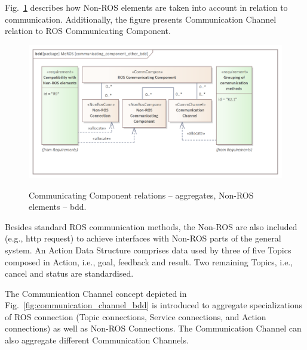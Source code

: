 \documentclass[11pt,oneside,a4paper]{article}
\begin{document}
	\pagebreak
	
	Fig.~\ref{fig:communicating_component_other_bdd} describes how Non-ROS elements are taken into account in relation to communication. Additionally, the figure presents Communication Channel relation to ROS Communicating Component.
	

	\begin{figure}[H]
		\centering
		\begin{center}
			{\includegraphics[scale=0.95]{img/meros_pkg/communicating_component_other_bdd.png}}
		\end{center}
		\caption{Communicating Component relations -- aggregates, Non-ROS elements -- bdd.} 
		\label{fig:communicating_component_other_bdd}
	\end{figure}
	
	Besides standard ROS communication methods, the Non-ROS are also included (e.g., http request) to achieve interfaces with Non-ROS parts of the general system. An Action Data Structure comprises data used by three of five Topics composed in Action, i.e., goal, feedback and result. Two remaining Topics, i.e., cancel and status are standardised.
	
	 The Communication Channel \cite{palka2022communication} concept depicted in Fig.~\ref{fig:communication_channel_bdd} is introduced to aggregate specializations of ROS connection (Topic connections, Service connections, and Action connections) as well as Non-ROS Connections. The Communication Channel can also aggregate different Communication Channels.
	 
\end{document}
